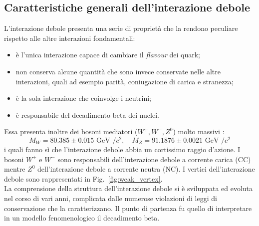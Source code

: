 \documentclass{subnucbo}
\begin{document}
\subsection{Caratteristiche generali dell'interazione debole}
L'interazione debole presenta una serie di proprietà che la rendono peculiare rispetto alle altre interazioni fondamentali:
\begin{itemize}
        \item è l'unica interazione capace di cambiare il \textit{flavour} dei quark;
        \item non conserva alcune quantità che sono invece conservate nelle altre interazioni, quali ad esempio parità, coniugazione di carica e stranezza;
        \item è la sola interazione che coinvolge i neutrini;
        \item è responsabile del decadimento beta dei nuclei.
\end{itemize}
Essa presenta inoltre dei bosoni mediatori ($W^{+}, W^{-}, Z^{0}$) molto massivi \cite{ref:PDG}:
\begin{equation}
        M _ { W } = 80.385 \pm 0.015 \text { GeV } / c ^ { 2 } , \quad M _ { Z } = 91.1876 \pm 0.0021 \text { GeV } / c ^ { 2 }
        \label{eq:bosons_masses}
\end{equation}
i quali fanno sì che l'interazione debole abbia un cortissimo raggio d'azione. I bosoni $W^{+}$ e $W^{-}$ sono responsabili dell'interazione debole a corrente carica (CC) mentre $Z^{0}$ dell'interazione debole a corrente neutra (NC). I vertici dell'interazione debole sono rappresentati in Fig.~\ref{fig:weak_vertex}. \\
La comprensione della struttura dell'interazione debole si è sviluppata ed evoluta nel corso di vari anni, complicata dalle numerose violazioni di leggi di conservazione che la caratterizzano. Il punto di partenza fu quello di interpretare in un modello fenomenologico il decadimento beta.
\end{document}

